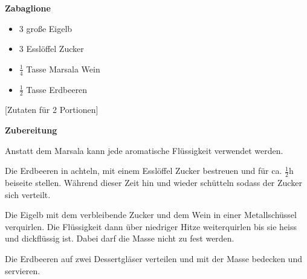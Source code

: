 

\parindent0pt	

\pagestyle{empty}


\textbf{{\LARGE Zabaglione}}%

\hrulefill
\vspace*{\fill}
\begin{multicols}{2}	


\begin{itemize}
\item 3 große Eigelb
\item 3 Esslöffel Zucker
\item $\frac{1}{4}$ Tasse Marsala Wein	
\item $\frac{1}{2}$ Tasse Erdbeeren
\end{itemize}
\end{multicols}
\vfill									%

\vspace{2cm}
%
\begin{center}
%
[Zutaten für 2 Portionen]%
\end{center}


\vfill
\newpage
\textbf{{\LARGE Zubereitung}}%

\hrulefill

\vspace*{\fill}
\begin{multicols}{2}

Anstatt dem Marsala kann jede aromatische Flüssigkeit verwendet werden.\newline

Die Erdbeeren in achteln, mit einem Esslöffel Zucker bestreuen und für ca. $\frac{1}{2}$h beiseite stellen.
Während dieser Zeit hin und wieder schütteln sodass der Zucker sich verteilt.\newline


Die Eigelb mit dem verbleibende Zucker und dem Wein in einer Metallschüssel verquirlen.
Die Flüssigkeit dann über niedriger Hitze weiterquirlen bis sie heiss und dickflüssig ist.
Dabei darf die Masse nicht zu fest werden.

Die Erdbeeren auf zwei Dessertgläser verteilen und mit der Masse bedecken und servieren.

\end{multicols}
\vfill
